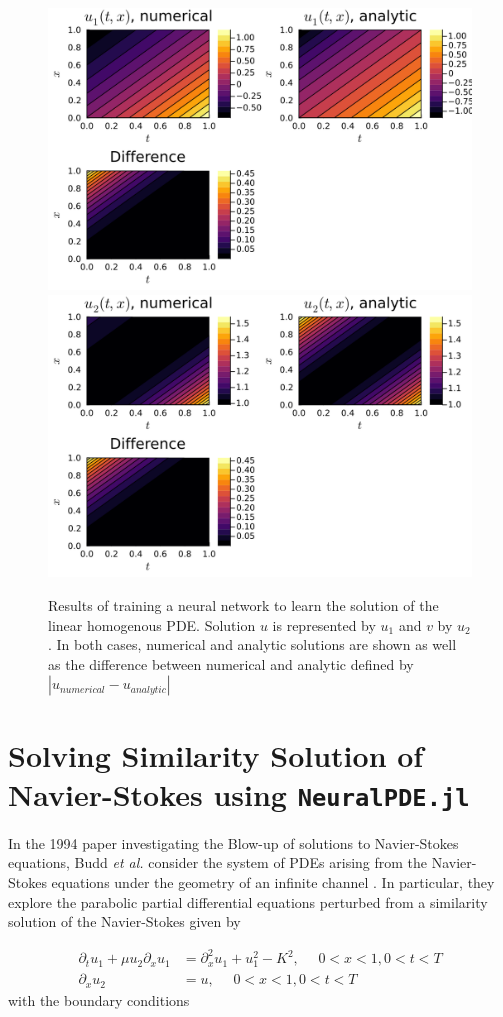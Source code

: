 \documentclass{CUP-JNL-DTM}%
\theoremstyle{definition}
\numberwithin{equation}{section}
\begin{document}
\begin{figure}
\centering
	\includegraphics[width=0.48\linewidth]{figures/linear_homo_PDE_plots/solution_1.png}
	\includegraphics[width=0.48\linewidth]{figures/linear_homo_PDE_plots/solution_2.png}
	\caption{Results of training a neural network to learn the solution of the linear homogenous PDE. Solution $u$ is represented by $u_1$ and $v$ by $u_2$. In both cases, numerical and analytic solutions are shown as well as the difference between numerical and analytic defined by $|u_{numerical} - u_{analytic}|$}
	\label{fig:results_linear}
\end{figure}

\section{Solving Similarity Solution of Navier-Stokes using \texttt{NeuralPDE.jl}}
\label{neural_PDE_eg2}

In the 1994 paper investigating the Blow-up of solutions to Navier-Stokes equations, Budd \textit{et al.} consider the system of PDEs arising from the Navier-Stokes equations under the geometry of an infinite channel \cite{buddBlowupSystemPartial1994}. In particular, they explore the parabolic partial differential equations perturbed from a similarity solution of the Navier-Stokes given by

\begin{equation}
\begin{split}
    \partial_t u_1 + \mu u_2 \partial_x u_1 & = \partial^2_{x} u_1 + u_1^2 - K^2, \,\,\,\,\,\,\,\, 0 < x < 1, 0 < t < T \\
    \partial_x u_2 & = u, \,\,\,\,\,\,\,\, 0 < x < 1, 0 < t < T
    \label{eqn:ns_problem}
\end{split}
\end{equation}
with the boundary conditions 
\end{document}

